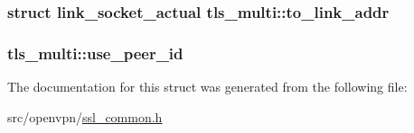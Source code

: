 \subsubsection[{to\+\_\+link\+\_\+addr}]{\setlength{\rightskip}{0pt plus 5cm}struct {\bf link\+\_\+socket\+\_\+actual} tls\+\_\+multi\+::to\+\_\+link\+\_\+addr}\label{structtls__multi_a35cf748c1d74ed47cd38b6c6ea096202}
\hypertarget{structtls__multi_aa1c6b330c9dd68a9f9dd6bf05d454642}{}
\subsubsection[{use\+\_\+peer\+\_\+id}]{ tls\+\_\+multi\+::use\+\_\+peer\+\_\+id}\label{structtls__multi_aa1c6b330c9dd68a9f9dd6bf05d454642}


The documentation for this struct was generated from the following file\+:\begin{DoxyCompactItemize}
\item 
src/openvpn/\hyperlink{ssl__common_8h}{ssl\+\_\+common.\+h}\end{DoxyCompactItemize}

